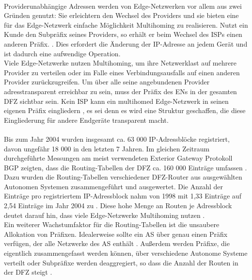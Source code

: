 \paragraph{}
Providerunabhängige Adressen werden von Edge-Netzwerken vor allem aus zwei Gründen genutzt: Sie erleichtern den Wechsel des Providers und sie bieten eine für das Edge-Netzwerk einfache Möglichkeit Multihoming zu realisieren. Nutzt ein Kunde den Subpräfix seines Providers, so erhält er beim Wechsel des ISPs einen anderen Präfix. \cite{jen:2008:start}. Dies erfordert die Änderung der IP-Adresse an jedem Gerät und ist dadurch eine aufwendige Operation. \\
Viele Edge-Netzwerke nutzen Multihoming, um ihre Netzwerklast auf mehrere Provider zu verteilen oder im Falle eines Verbindungsausfalls auf einen anderen Provider zurückzugreifen. Um über alle seine angebundenen Provider adresstransparent erreichbar zu sein, muss der Präfix des ENs in der gesamten DFZ sichtbar sein. Kein ISP kann ein multihomed Edge-Netzwerk in seinen eigenen Präfix eingliedern \cite{jen:2008:start}, es sei denn es wird eine Struktur geschaffen, die diese Eingliederung für andere Endgeräte transparent macht.

\paragraph{}
Bis zum Jahr 2004 wurden insgesamt ca. 63 000 IP-Adressblöcke registriert, davon ungefähr 18 000 in den letzten 7 Jahren. Im gleichen Zeitraum durchgeführte Messungen am meist verwendeten Exterior Gateway Protokoll BGP zeigten, dass die Routing-Tabellen der DFZ ca. 160 000 Einträge umfassen \cite{journals/ccr/MengXZHLZ04}. Dazu wurden die Routing-Tabellen verschiedener DFZ-Router aus ausgewählten Autonomen Systemen zusammengeführt und ausgewertet. Die Anzahl der Einträge pro registriertem IP-Adressblock nahm von 1998 mit 1,33 Einträge auf 2,54 Einträge im Jahr 2004 zu \cite{journals/ccr/MengXZHLZ04}. Diese hohe Menge an Routen je Adressblock deutet darauf hin, dass viele Edge-Netzwerke Multihoming nutzen \cite{huston:2001:analyzing}.\\

Ein weiterer Wachstumfaktor für die Routing-Tabellen ist die unsaubere Allokation von Präfixen. Idealerweise sollte ein AS über genau einen Präfix verfügen, der alle Netzwerke des AS enthält \cite{hawkinson:1996:autnomousSystems}. Außerdem werden Präfixe, die eigentlich zusammengefasst werden können, über verschiedene Autonome Systeme verteilt oder Subpräfixe werden deaggregiert, so dass die Anzahl der Routen in der DFZ steigt \cite{journals/ccr/MengXZHLZ04}. \\

